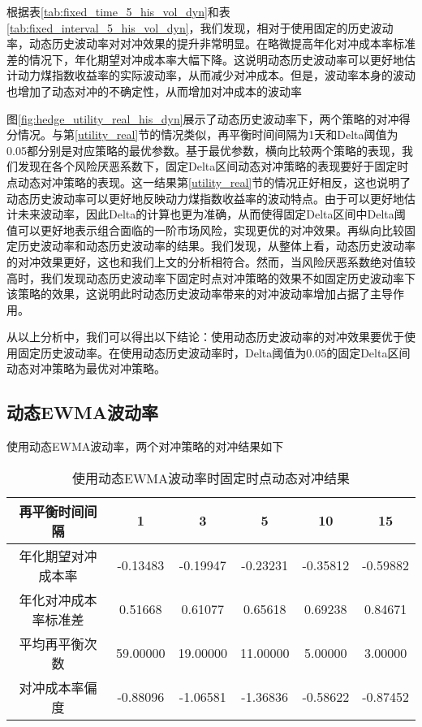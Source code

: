 根据表\ref{tab:fixed_time_5_his_vol_dyn}和表\ref{tab:fixed_interval_5_his_vol_dyn}，我们发现，相对于使用固定的历史波动率，动态历史波动率对对冲效果的提升非常明显。在略微提高年化对冲成本率标准差的情况下，年化期望对冲成本率大幅下降。这说明动态历史波动率可以更好地估计动力煤指数收益率的实际波动率，从而减少对冲成本。但是，波动率本身的波动也增加了动态对冲的不确定性，从而增加对冲成本的波动率

图\ref{fig:hedge_utility_real_his_dyn}展示了动态历史波动率下，两个策略的对冲得分情况。与第\ref{utility_real}节的情况类似，再平衡时间间隔为1天和Delta阈值为0.05都分别是对应策略的最优参数。基于最优参数，横向比较两个策略的表现，我们发现在各个风险厌恶系数下，固定Delta区间动态对冲策略的表现要好于固定时点动态对冲策略的表现。这一结果第\ref{utility_real}节的情况正好相反，这也说明了动态历史波动率可以更好地反映动力煤指数收益率的波动特点。由于可以更好地估计未来波动率，因此Delta的计算也更为准确，从而使得固定Delta区间中Delta阈值可以更好地表示组合面临的一阶市场风险，实现更优的对冲效果。再纵向比较固定历史波动率和动态历史波动率的结果。我们发现，从整体上看，动态历史波动率的对冲效果更好，这也和我们上文的分析相符合。然而，当风险厌恶系数绝对值较高时，我们发现动态历史波动率下固定时点对冲策略的效果不如固定历史波动率下该策略的效果，这说明此时动态历史波动率带来的对冲波动率增加占据了主导作用。

从以上分析中，我们可以得出以下结论：使用动态历史波动率的对冲效果要优于使用固定历史波动率。在使用动态历史波动率时，Delta阈值为0.05的固定Delta区间动态对冲策略为最优对冲策略。

\subsection{动态EWMA波动率}

使用动态EWMA波动率，两个对冲策略的对冲结果如下

\begin{table}[htbp]
  \centering
  \caption{使用动态EWMA波动率时固定时点动态对冲结果}
  \label{tab:fixed_time_5_ewma_vol_dyn}
  \begin{tabular}{cccccc}
    \toprule
    再平衡时间间隔 & 1 & 3 & 5 & 10 & 15 \\
    \midrule
    年化期望对冲成本率 & -0.13483 & -0.19947 & -0.23231 & -0.35812 & -0.59882 \\
    年化对冲成本率标准差 & 0.51668 & 0.61077 & 0.65618 & 0.69238 & 0.84671 \\
    平均再平衡次数 & 59.00000 & 19.00000 & 11.00000 & 5.00000 & 3.00000 \\
    对冲成本率偏度 & -0.88096 & -1.06581 & -1.36836 & -0.58622 & -0.87452 \\
    \bottomrule
  \end{tabular}
\end{table}

